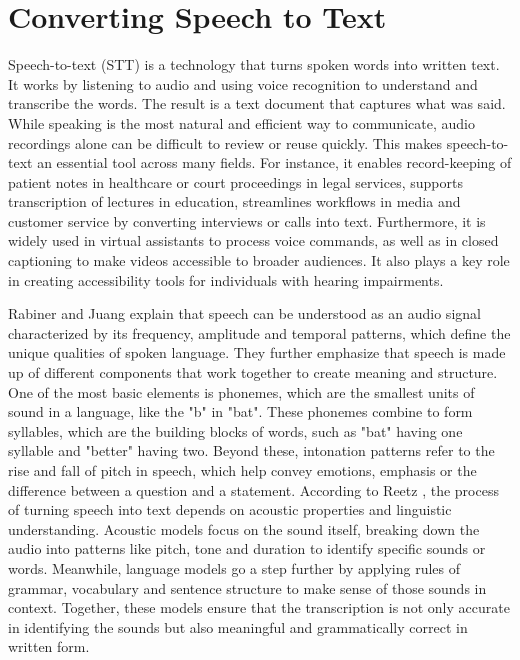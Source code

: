 \section{Converting Speech to Text}
Speech-to-text (STT) is a technology that turns spoken words into written text. It works by listening to audio and using voice recognition to understand and transcribe the words. The result is a text document that captures what was said. While speaking is the most natural and efficient way to communicate, audio recordings alone can be difficult to review or reuse quickly. This makes speech-to-text an essential tool across many fields. For instance, it enables record-keeping of patient notes in healthcare or court proceedings in legal services, supports transcription of lectures in education, streamlines workflows in media and customer service by converting interviews or calls into text. Furthermore, it is widely used in virtual assistants to process voice commands, as well as in closed captioning to make videos accessible to broader audiences. It also plays a key role in creating accessibility tools for individuals with hearing impairments.

Rabiner and Juang \cite{rabiner1993speechrecognition} explain that speech can be understood as an audio signal characterized by its frequency, amplitude and temporal patterns, which define the unique qualities of spoken language. They further emphasize that speech is made up of different components that work together to create meaning and structure. One of the most basic elements is phonemes, which are the smallest units of sound in a language, like the "b" in "bat". These phonemes combine to form syllables, which are the building blocks of words, such as "bat" having one syllable and "better" having two. Beyond these, intonation patterns refer to the rise and fall of pitch in speech, which help convey emotions, emphasis or the difference between a question and a statement. According to Reetz \cite{reetz2020phonetics}, the process of turning speech into text depends on acoustic properties and linguistic understanding. Acoustic models focus on the sound itself, breaking down the audio into patterns like pitch, tone and duration to identify specific sounds or words. Meanwhile, language models go a step further by applying rules of grammar, vocabulary and sentence structure to make sense of those sounds in context. Together, these models ensure that the transcription is not only accurate in identifying the sounds but also meaningful and grammatically correct in written form.

